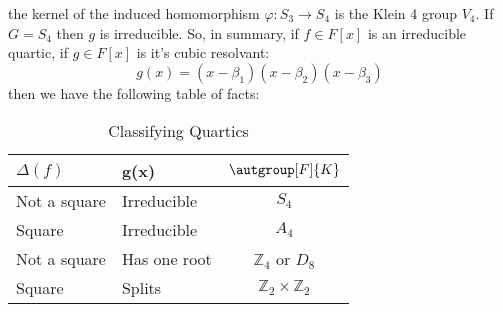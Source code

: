 \documentclass{article}                                                        %
\begin{document}
        the kernel of the induced homomorphism $\varphi:S_{3}\rightarrow{S}_{4}$
        is the Klein 4 group $V_{4}$. If $G=S_{4}$ then $g$ is irreducible.
        So, in summary, if $f\in{F}[x]$ is an irreducible quartic, if
        $g\in{F}[x]$ is it's cubic resolvant:
        \begin{equation}
            g(x)=(x-\beta_{1})(x-\beta_{2})(x-\beta_{3})
        \end{equation}
        then we have the following table of facts:
        \begin{table}[H]
            \centering
            \captionsetup{type=table}
            \begin{tabular}{l|l|c}
                $\Delta(f)$&g(x)&$\autgroup[F]{K}$\\
                \hline
                Not a square&Irreducible&$S_{4}$\\
                Square&Irreducible&$A_{4}$\\
                Not a square&Has one root&$\mathbb{Z}_{4}$ or $D_{8}$\\
                Square&Splits&$\mathbb{Z}_{2}\times\mathbb{Z}_{2}$
            \end{tabular}
            \caption{Classifying Quartics}
        \end{table}
\end{document}
